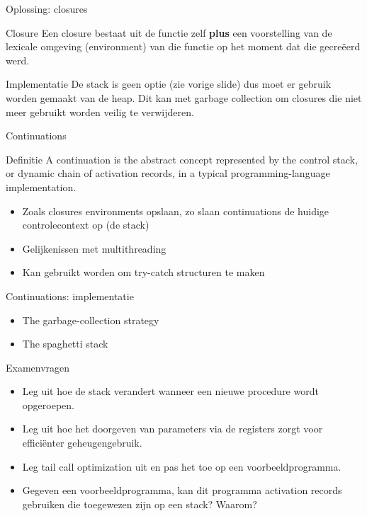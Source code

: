 \documentclass{beamer}
\begin{document}
\begin{frame}{Oplossing: closures}
	\begin{block}{Closure}
		Een closure bestaat uit de functie zelf \textbf{plus} een voorstelling van de lexicale omgeving (environment) van die functie op het moment dat die gecreëerd werd.
	\end{block}
	\begin{block}{Implementatie}
		De stack is geen optie (zie vorige slide) dus moet er gebruik worden gemaakt van de heap. Dit kan met garbage collection om closures die niet meer gebruikt worden veilig te verwijderen.
	\end{block}
\end{frame}

\begin{frame}{Continuations}
	\begin{block}{Definitie}
		A continuation is the abstract concept represented by the control stack, or dynamic chain of activation records, in a typical programming-language implementation.
	\end{block}
	\begin{itemize}
		\item Zoals closures environments opslaan, zo slaan continuations de huidige controlecontext op (de stack)
		\item Gelijkenissen met multithreading
		\item Kan gebruikt worden om try-catch structuren te maken
	\end{itemize}
\end{frame}

\begin{frame}{Continuations: implementatie}
	\begin{itemize}
		\item The garbage-collection strategy
		\item The spaghetti stack
	\end{itemize}
\end{frame}

\begin{frame}{Examenvragen}
    \begin{itemize}
        \item Leg uit hoe de stack verandert wanneer een nieuwe procedure wordt opgeroepen.
        \item Leg uit hoe het doorgeven van parameters via de registers zorgt voor efficiënter geheugengebruik.
        \item Leg tail call optimization uit en pas het toe op een voorbeeldprogramma.
        \item Gegeven een voorbeeldprogramma, kan dit programma activation records gebruiken die toegewezen zijn op een stack? Waarom?
    \end{itemize}
\end{frame}
\end{document}
